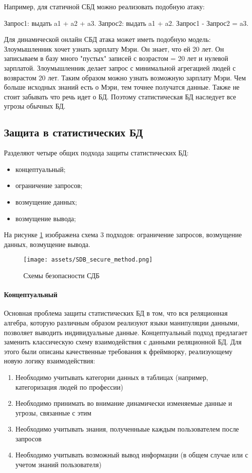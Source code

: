 Например, для статичной СБД можно реализовать подобную атаку:

Запрос1: выдать a1 + a2 + a3. Запрос2: выдать a1 + a2. Запрос1 - Запрос2 = a3.

Для динамической онлайн СБД атака может иметь подобную модель:
Злоумышленник хочет узнать зарплату Мэри. Он знает, что ей 20 лет. Он записываем в базу много "пустых" записей с возрастом = 20 лет и нулевой зарплатой. Злоумышленник делает запрос с минимальной агрегацией людей с возврастом 20 лет. Таким образом можно узнать возможную зарплату Мэри. Чем больше исходных знаний есть о Мэри, тем точнее получатся данные.
Также не стоит забывать что речь идет о БД. Поэтому статистическая БД наследует все угрозы обычных БД.

  \subsection{Защита в статистических БД}

Разделяют четыре общих подхода защиты статистических БД:
\begin{itemize}
  \item концептуальный;
	\item ограничение запросов;
	\item возмущение данных;
	\item возмущение вывода;
\end{itemize}
На рисунке \ref{fig:SDB_secure} изображена схема 3 подходов: ограничение запросов, возмущение данных, возмущение вывода.
\begin{figure}[h]
    \centering
    \texttt{[image: assets/SDB\_secure\_method.png]}
    \caption{Схемы безопасности СДБ}
    \label{fig:SDB_secure}
\end{figure}
\paragraph{Концептуальный}

Основная проблема защиты статистических БД в том, что вся реляционная алгебра, которую различным образом реализуют языки манипуляции данными, позволяет выводить индивидуальные данные. Концептуальный подход предлагает заменить классическую схему взаимодействия с данными реляционной БД. Для этого были описаны качественные требования к фреймворку, реализующему новую логику взаимодействия:
\begin{enumerate}
  \item Необходимо учитывать категории данных в таблицах (например, категоризация людей по профессии)
  \item Необходимо принимать во внимание динамически изменяемые данные и угрозы, связанные с этим
  \item Необходимо учитывать знания, полученныые каждым пользователем после запросов
  \item Необходимо учитывать возможный вывод информации (в общем случае или с учетом знаний пользователя)
\end{enumerate}

